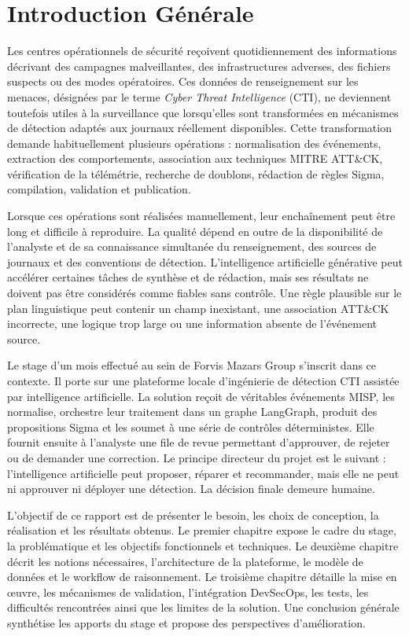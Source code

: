 \chapter*{Introduction Générale}

Les centres opérationnels de sécurité reçoivent quotidiennement des informations décrivant des campagnes malveillantes, des infrastructures adverses, des fichiers suspects ou des modes opératoires. Ces données de renseignement sur les menaces, désignées par le terme \textit{Cyber Threat Intelligence} (CTI), ne deviennent toutefois utiles à la surveillance que lorsqu'elles sont transformées en mécanismes de détection adaptés aux journaux réellement disponibles. Cette transformation demande habituellement plusieurs opérations : normalisation des événements, extraction des comportements, association aux techniques MITRE ATT\&CK, vérification de la télémétrie, recherche de doublons, rédaction de règles Sigma, compilation, validation et publication.

Lorsque ces opérations sont réalisées manuellement, leur enchaînement peut être long et difficile à reproduire. La qualité dépend en outre de la disponibilité de l'analyste et de sa connaissance simultanée du renseignement, des sources de journaux et des conventions de détection. L'intelligence artificielle générative peut accélérer certaines tâches de synthèse et de rédaction, mais ses résultats ne doivent pas être considérés comme fiables sans contrôle. Une règle plausible sur le plan linguistique peut contenir un champ inexistant, une association ATT\&CK incorrecte, une logique trop large ou une information absente de l'événement source.

Le stage d'un mois effectué au sein de Forvis Mazars Group s'inscrit dans ce contexte. Il porte sur une plateforme locale d'ingénierie de détection CTI assistée par intelligence artificielle. La solution reçoit de véritables événements MISP, les normalise, orchestre leur traitement dans un graphe LangGraph, produit des propositions Sigma et les soumet à une série de contrôles déterministes. Elle fournit ensuite à l'analyste une file de revue permettant d'approuver, de rejeter ou de demander une correction. Le principe directeur du projet est le suivant : l'intelligence artificielle peut proposer, réparer et recommander, mais elle ne peut ni approuver ni déployer une détection. La décision finale demeure humaine.

L'objectif de ce rapport est de présenter le besoin, les choix de conception, la réalisation et les résultats obtenus. Le premier chapitre expose le cadre du stage, la problématique et les objectifs fonctionnels et techniques. Le deuxième chapitre décrit les notions nécessaires, l'architecture de la plateforme, le modèle de données et le workflow de raisonnement. Le troisième chapitre détaille la mise en œuvre, les mécanismes de validation, l'intégration DevSecOps, les tests, les difficultés rencontrées ainsi que les limites de la solution. Une conclusion générale synthétise les apports du stage et propose des perspectives d'amélioration.